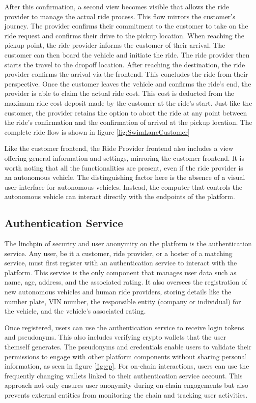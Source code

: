 After this confirmation, a second view becomes visible that allows the ride provider to manage the actual ride process. This flow mirrors the customer's journey. The provider confirms their commitment to the customer to take on the ride request and confirms their drive to the pickup location. When reaching the pickup point, the ride provider informs the customer of their arrival. The customer can then board the vehicle and initiate the ride. The ride provider then starts the travel to the dropoff location. After reaching the destination, the ride provider confirms the arrival via the frontend. This  concludes the ride from their perspective. Once the customer leaves the vehicle and confirms the ride's end, the provider is able to claim the actual ride cost. This cost is deducted from the maximum ride cost deposit made by the customer at the ride's start. 
Just like the customer, the provider retains the option to abort the ride at any point between the ride's confirmation and the confirmation of arrival at the pickup location. The complete ride flow is shown in figure \ref{fig:SwimLaneCustomer}

Like the customer frontend, the Ride Provider frontend also includes a view offering general information and settings, mirroring the customer frontend. It is worth noting that all the functionalities are present, even if the ride provider is an autonomous vehicle. The distinguishing factor here is the absence of a visual user interface for autonomous vehicles. Instead, the computer that controls the autonomous vehicle can interact directly with the endpoints of the platform.

\subsection{Authentication Service}\label{subsec:AuthService}

The linchpin of security and user anonymity on the platform is the authentication service. Any user, be it a customer, ride provider, or a hoster of a matching service, must first register with an authentication service to interact with the platform. This service is the only component that manages user data such as name, age, address, and the associated rating. It also oversees the registration of new autonomous vehicles and human ride providers, storing details like the number plate, VIN number, the responsible entity (company or individual) for the vehicle, and the vehicle's associated rating.

Once registered, users can use the authentication service to receive login tokens and pseudonyms. This also includes verifying crypto wallets that the user themself generates. The pseudonyms and credentials enable users to validate their permissions to engage with other platform components without sharing personal information, as seen in figure \ref{fig:cp}. For on-chain interactions, users can use the frequently changing wallets linked to their authentication service account. This approach not only ensures user anonymity during on-chain engagements but also prevents external entities from monitoring the chain and tracking user activities. 

